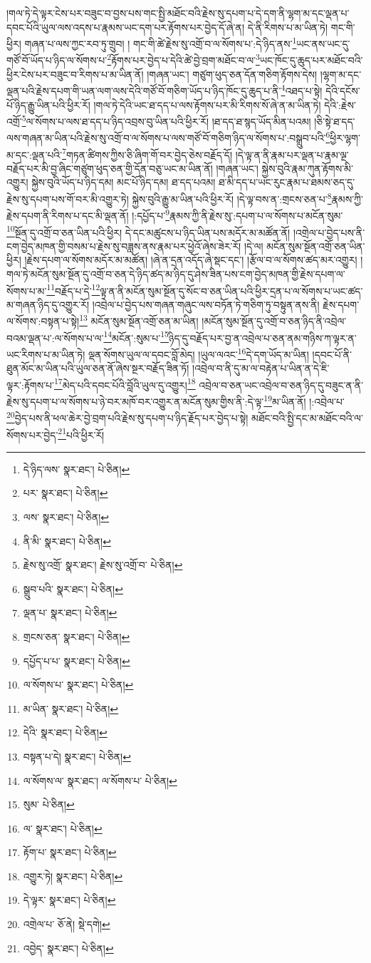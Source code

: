 །གལ་ཏེ་དེ་ལྟར་ངེས་པར་བཟུང་བ་བྱས་པས་གང་སྤྱི་མཐོང་བའི་རྗེས་སུ་དཔག་པ་དེ་དག་ནི་ལྷག་མ་དང་ལྡན་པ་དབང་པོའི་ཡུལ་ལས་འདས་པ་རྣམས་ཡང་དག་པར་རྟོགས་པར་བྱེད་དོ་ཞེ་ན། དེ་ནི་རིགས་པ་མ་ཡིན་ཏེ། གང་གི་ཕྱིར། གཞན་པ་ལས་ཀྱང་རབ་ཏུ་གྲུབ། །
གང་གི་ཚེ་རྗེས་སུ་འགྲོ་བ་ལ་སོགས་པ་:དེ་ཉིད་ནས་\footnote{དེ་ཉིད་ལས་  སྣར་ཐང་།  པེ་ཅིན། }ཡང་ནས་ཡང་དུ་གཙོ་བོ་ཡོད་པ་ཉིད་ལ་སོགས་པ་\footnote{པར་  སྣར་ཐང་།  པེ་ཅིན། }རྟོགས་པར་བྱེད་པ་དེའི་ཚེ་བྱེ་བྲག་མཐོང་བ་ལ་\footnote{ལས་  སྣར་ཐང་།  པེ་ཅིན། }ཡང་ཁོང་དུ་ཆུད་པར་མཐོང་བའི་ཕྱིར་ངེས་པར་བཟུང་བ་རིགས་པ་མ་ཡིན་ནོ། །གཞན་ཡང་། གཙུག་ཕུད་ཅན་དོན་གཅིག་རྟོགས་དེས། །ལྷག་མ་དང་ལྡན་པའི་རྗེས་དཔག་གི་ཡན་ལག་ལས་དེའི་གཙོ་བོ་གཅིག་ཡོད་པ་ཉིད་ཁོང་དུ་ཆུད་པ་ནི་\footnote{ནི་མི་  སྣར་ཐང་།  པེ་ཅིན། }འཐད་པ་སྟེ། དེའི་དངོས་པོ་ཉིད་རྒྱུ་ཡིན་པའི་ཕྱིར་རོ། །གལ་ཏེ་དེའི་ཡང་ཐ་དད་པ་ལས་རྟོགས་པར་མི་རིགས་སོ་ཞེ་ན་མ་ཡིན་ཏེ། དེའི་:རྗེས་འགྲོ་\footnote{རྗེས་སུ་འགྲོ་  སྣར་ཐང་། རྗེས་སུ་འགྲོ་བ་  པེ་ཅིན། }ལ་སོགས་པ་ལས་ཐ་དད་པ་ཉིད་འབྲས་བུ་ཡིན་པའི་ཕྱིར་རོ། །ཐ་དད་ཐ་སྙད་ཡོད་མིན་པའམ། །ཅི་སྟེ་ཐ་དད་ལས་གཞན་མ་ཡིན་པའི་རྗེས་སུ་འགྲོ་བ་ལ་སོགས་པ་ལས་གཙོ་བོ་གཅིག་ཉིད་ལ་སོགས་པ་:བསྒྲུབ་པའི་\footnote{སྒྲུབ་པའི་  སྣར་ཐང་།  པེ་ཅིན། }ཕྱིར་ལྷག་མ་དང་:ལྡན་པའི་\footnote{ལྡན་པ་  སྣར་ཐང་།  པེ་ཅིན། }གཏན་ཚིགས་ཀྱིས་ཅི་ཞིག་གོ་བར་བྱེད་ཅེས་བརྗོད་དོ། །དེ་ལྟ་ན་ནི་རྣམ་པར་ལྡན་པ་རྣམ་ལྔ་བརྗོད་པར་མི་བྱ་ཞིང་གཙུག་ཕུད་ཅན་གྱི་དོན་བཅུ་ཡང་མ་ཡིན་ནོ། །གཞན་ཡང་། སྐྱེས་བུའི་རྣམ་ཀུན་རྟོགས་མི་འགྱུར། སྐྱེས་བུའི་ཡོད་པ་ཉིད་དམ། མང་པོ་ཉིད་དམ། ཐ་དད་པའམ། ཐ་མི་དད་པ་ཡང་རུང་རྣམ་པ་ཐམས་ཅད་དུ་རྗེས་སུ་དཔག་པས་གོ་བར་མི་འགྱུར་ཏེ། སྐྱེས་བུའི་རྒྱུ་མ་ཡིན་པའི་ཕྱིར་རོ། །དེ་ལྟ་བས་ན་:གྲངས་ཅན་པ་\footnote{གྲངས་ཅན་  སྣར་ཐང་།  པེ་ཅིན། }རྣམས་ཀྱི་རྗེས་དཔག་ནི་རིགས་པ་དང་མི་ལྡན་ནོ། །:དཔྱོད་པ་\footnote{དཔྱོད་པ་པ་  སྣར་ཐང་།  པེ་ཅིན། }རྣམས་ཀྱི་ནི་རྗེས་སུ་:དཔག་པ་ལ་སོགས་པ་མངོན་སུམ་\footnote{ལ་སོགས་པ་  སྣར་ཐང་།  པེ་ཅིན། }སྔོན་དུ་འགྲོ་བ་ཅན་ཡིན་པའི་ཕྱིར། དེ་དང་མཚུངས་པ་ཉིད་ཡིན་པས་མདོར་མ་མཚོན་ནོ། །འགྲེལ་པ་བྱེད་པས་ནི་ངག་བྱེད་མཁན་གྱི་བསམ་པ་རྗེས་སུ་བཟླས་ནས་རྣམ་པར་ཕྱེའོ་ཞེས་ཟེར་རོ། །དེ་ལ། མངོན་སུམ་སྔོན་འགྲོ་ཅན་ཡིན་ཕྱིར། །རྗེས་དཔག་ལ་སོགས་མདོར་མ་མཚོན། །ཞེ་ན་དྲན་འདོད་ཞེ་སྡང་དང་། །རྩོལ་བ་ལ་སོགས་ཚད་མར་འགྱུར། །གལ་ཏེ་མངོན་སུམ་སྔོན་དུ་འགྲོ་བ་ཅན་དེ་ཉིད་ཚད་མ་ཉིད་དུ་ཤེས་ཟིན་པས་ངག་བྱེད་མཁན་གྱི་རྗེས་དཔག་ལ་སོགས་པ་མ་\footnote{མ་ཡིན་  སྣར་ཐང་།  པེ་ཅིན། }བརྗོད་པ་དེ་\footnote{དེའི་  སྣར་ཐང་།  པེ་ཅིན། }ལྟ་ན་ནི་མངོན་སུམ་སྔོན་དུ་སོང་བ་ཅན་ཡིན་པའི་ཕྱིར་དྲན་པ་ལ་སོགས་པ་ཡང་ཚད་མ་གཞན་ཉིད་དུ་འགྱུར་རོ། །འབྲེལ་པ་བྱེད་པས་གཞན་གཞུང་ལས་བཏོན་ཏེ་གཅིག་ཏུ་བསྟུན་ནས་ནི། རྗེས་དཔག་ལ་སོགས་:བསྟན་པ་སྟེ།\footnote{བསྟན་པ་དེ།  སྣར་ཐང་།  པེ་ཅིན། } མངོན་སུམ་སྔོན་འགྲོ་ཅན་མ་ཡིན། །མངོན་སུམ་སྔོན་དུ་འགྲོ་བ་ཅན་ཉིད་ནི་འབྲེལ་བའམ་ལྡན་པ་:ལ་སོགས་པ་ལ་\footnote{ལ་སོགས་ལ་  སྣར་ཐང་། ལ་སོགས་པ་  པེ་ཅིན། }མངོན་:སུམ་པ་\footnote{སུམ་  པེ་ཅིན། }ཉིད་དུ་བརྗོད་པར་བྱ་ན་འབྲེལ་པ་ཅན་ནམ་གཉིས་ཀ་ལྟར་ན་ཡང་རིགས་པ་མ་ཡིན་ཏེ། ལྡན་སོགས་ཡུལ་ལ་དབང་བློ་མེད། །ཡུལ་ལའང་\footnote{ལ་  སྣར་ཐང་།  པེ་ཅིན། }དེ་དག་ཡོད་མ་ཡིན། །དབང་པོ་ནི་ཐུན་མོང་མ་ཡིན་པའི་ཡུལ་ཅན་ནོ་ཞེས་སྔར་བརྗོད་ཟིན་ཏོ། །འབྲེལ་བ་ནི་དུ་མ་ལ་བརྟེན་པ་ཡིན་ན་དེ་ཇི་ལྟར་:རྟོགས་པ་\footnote{རྟོག་པ་  སྣར་ཐང་།  པེ་ཅིན། }མེད་པའི་དབང་པོའི་བློའི་ཡུལ་དུ་འགྱུར།\footnote{འགྱུར་ཏེ།  སྣར་ཐང་།  པེ་ཅིན། } འབྲེལ་བ་ཅན་ཡང་འབྲེལ་བ་ཅན་ཉིད་དུ་བཟུང་ན་ནི་རྗེས་སུ་དཔག་པ་ལ་སོགས་པ་ཉེ་བར་མཁོ་བར་འགྱུར་ན་མངོན་སུམ་གྱིས་ནི་:དེ་ལྟ་\footnote{དེ་ལྟར་  སྣར་ཐང་།  པེ་ཅིན། }མ་ཡིན་ནོ། །:འབྲེལ་པ་\footnote{འགྲེལ་པ་  ཅོ་ནེ།  སྡེ་དགེ། }བྱེད་པས་ནི་ཕལ་ཆེར་བྱེ་བྲག་པའི་རྗེས་སུ་དཔག་པ་ཉིད་རྗོད་པར་བྱེད་པ་སྟེ། མཐོང་བའི་སྤྱི་དང་མ་མཐོང་བའི་ལ་སོགས་པར་བྱེད་\footnote{འབྱེད་  སྣར་ཐང་།  པེ་ཅིན། }པའི་ཕྱིར་རོ། 